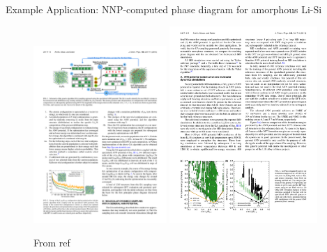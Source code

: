 \documentclass[aspectratio=169]{beamer}
\begin{document}
\begin{frame}{Example Application: NNP-computed phase diagram for amorphous Li-Si}
\begin{figure}
    \centering
    \includegraphics[width=0.45\textwidth]{figures/li-si-nnp.pdf}
    \includegraphics[width=0.5\textwidth]{figures/li-si-nnp2.pdf}
    \caption{From ref \cite{artrithConstructingFirstprinciplesPhase2018}}
\end{figure}
\end{frame}
\end{document}
